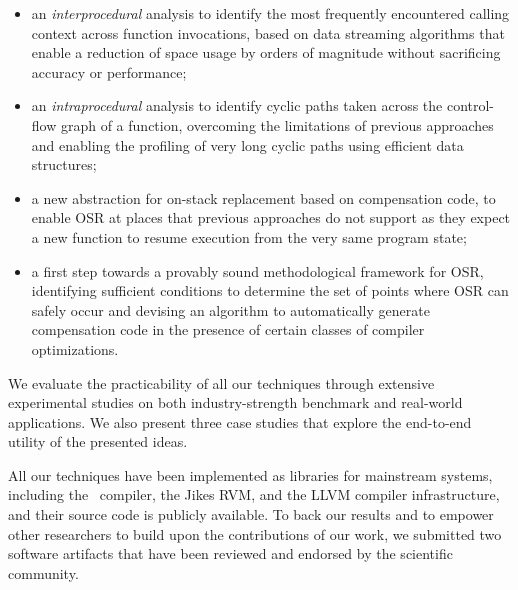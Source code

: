 \begin{itemize}
 \item an {\em interprocedural} analysis to identify the most frequently encountered calling context across function invocations, based on data streaming algorithms that enable a reduction of space usage by orders of magnitude without sacrificing accuracy or performance;
 \item an {\em intraprocedural} analysis to identify cyclic paths taken across the control-flow graph of a function, overcoming the limitations of previous approaches and enabling the profiling of very long cyclic paths using efficient data structures;
 \item a new abstraction for on-stack replacement based on compensation code, to enable OSR at places that previous approaches do not support as they expect a new function to resume execution from the very same program state;
 \item a first step towards a provably sound methodological framework for OSR, identifying sufficient conditions to determine the set of points where OSR can safely occur and devising an algorithm to automatically generate compensation code in the presence of certain classes of compiler optimizations.
\end{itemize}

\noindent We evaluate the practicability of all our techniques through extensive experimental studies on both industry-strength benchmark and real-world applications. We also present three case studies that explore the end-to-end utility of the presented ideas. 

All our techniques have been implemented as libraries for mainstream systems, including the \gcc\ compiler, the Jikes RVM, and the LLVM compiler infrastructure, and their source code is publicly available. To back our results and to empower other researchers to build upon the contributions of our work, we submitted two software artifacts that have been reviewed and endorsed by the scientific community.


